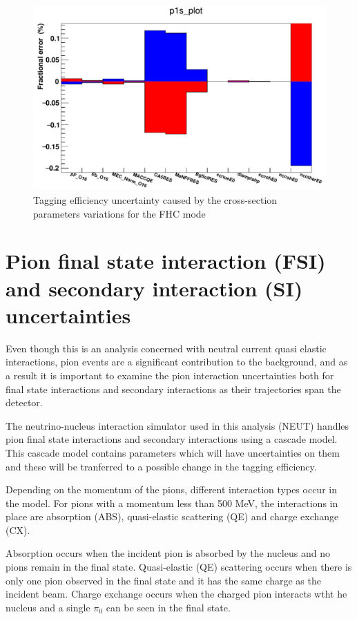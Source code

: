 \begin{figure}
    \includegraphics[scale=0.4]{Figures/xsec_uncertainty.png}
\caption{Tagging efficiency uncertainty caused by the cross-section parameters variations for the FHC mode}
\label{fig:xsecuncertainty}
\end{figure}

\section{Pion final state interaction (FSI) and secondary interaction (SI) uncertainties}

Even though this is an analysis concerned with neutral current quasi elastic interactions, pion events are a significant contribution to the background, and as a result it is important to examine the pion interaction uncertainties both for final state interactions and secondary interactions as their trajectories span the detector. 
\newline


The neutrino-nucleus interaction simulator used in this analysis (NEUT) handles pion final state interactions and secondary interactions using a cascade model. This cascade model contains parameters which will have uncertainties on them and these will be tranferred to a possible change in the tagging efficiency.

Depending on the momentum of the pions, different interaction types occur in the model. For pions with a momentum less than 500 MeV, the interactions in place are absorption (ABS), quasi-elastic scattering (QE) and charge exchange (CX).

Absorption occurs when the incident pion is absorbed by the nucleus and no pions remain in the final state. Quasi-elastic (QE) scattering occurs when there is only one pion observed in the final state and it has the same charge as the incident beam. Charge exchange occurs when the charged pion interacts wtht he nucleus and a single $\pi_{0}$ can be seen in the final state.



